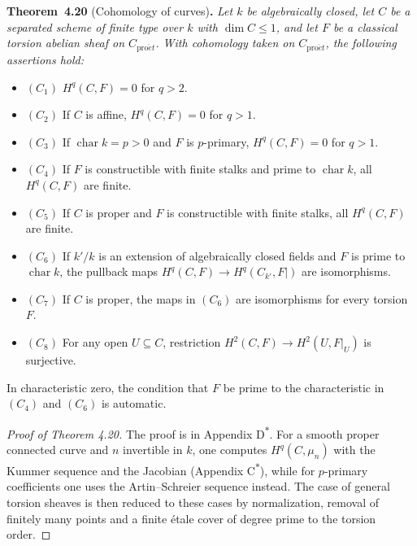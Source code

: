 \documentclass[11pt]{article}
\newenvironment{bpstatement}[2]{\par\addvspace{0.6\baselineskip}\noindent\textbf{#1}#2\textbf{.}\enspace\ignorespaces}
  {\par\addvspace{0.4\baselineskip}}
\newenvironment{bpstatementit}[2]{\begin{bpstatement}{#1}{#2}\itshape\ignorespaces}{\end{bpstatement}}
\newcommand{\bpout}[1]{#1\textsuperscript{\hyperlink{bp-outside}{\ensuremath{\ast}}}}
\begin{document}
\label{bp340}%
\begin{bpstatementit}{Theorem~4.20}{ (Cohomology of curves)}
Let \(k\) be algebraically closed, let \(C\) be a separated scheme of finite type over \(k\) with \(\dim C\leq1\), and let \(F\) be a classical torsion abelian sheaf on \(C_{\mathrm{pro}\acute{e}t}\). With cohomology taken on \(C_{\mathrm{pro}\acute{e}t}\), the following assertions hold:

\begin{itemize}
\item \((C_{1})\) \(H^q(C,F)=0\) for \(q>2\).
\item \((C_{2})\) If \(C\) is affine, \(H^q(C,F)=0\) for \(q>1\).
\item \((C_{3})\) If \(\operatorname{char}k=p>0\) and \(F\) is \(p\)-primary, \(H^q(C,F)=0\) for \(q>1\).
\item \((C_{4})\) If \(F\) is constructible with finite stalks and prime to \(\operatorname{char}k\), all \(H^q(C,F)\) are finite.
\item \((C_{5})\) If \(C\) is proper and \(F\) is constructible with finite stalks, all \(H^q(C,F)\) are finite.
\item \((C_{6})\) If \(k'/k\) is an extension of algebraically closed fields and \(F\) is prime to \(\operatorname{char}k\), the pullback maps \(H^q(C,F)\to H^q(C_{k'},F|)\) are isomorphisms.
\item \((C_{7})\) If \(C\) is proper, the maps in \((C_6)\) are isomorphisms for every torsion \(F\).
\item \((C_{8})\) For any open \(U\subseteq C\), restriction \(H^2(C,F)\to H^2(U,F|_U)\) is surjective.
\end{itemize}
\end{bpstatementit}

\label{bp341}%
In characteristic zero, the condition that \(F\) be prime to the characteristic in \((C_4)\) and \((C_6)\) is automatic.

\begin{proof}[{Proof of Theorem 4.20}]\label{bp342}%
The proof is in Appendix \bpout{D}. For a smooth proper connected curve and \(n\) invertible in \(k\), one computes \(H^q(C,\mu_n)\) with the Kummer sequence and the Jacobian (Appendix \bpout{C}), while for \(p\)-primary coefficients one uses the Artin–Schreier sequence instead. The case of general torsion sheaves is then reduced to these cases by normalization, removal of finitely many points and a finite étale cover of degree prime to the torsion order.
\end{proof}
\end{document}
